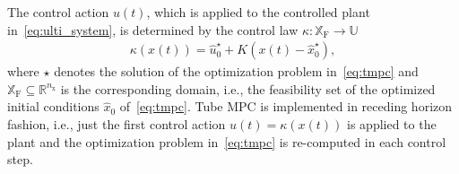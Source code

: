 \documentclass[letterpaper, 10 pt, conference]{ieeeconf}
\begin{document}
The control action $u(t)$, which is applied to the controlled plant in~\eqref{eq:ulti_system}, is determined by the control law $\kappa : \mathbb{X}_{\mathrm{F}} \rightarrow \mathbb{U}$
\begin{eqnarray}
	\label{eq:tmpc_control_law}
	\kappa(x(t)) = \hat{u}_{0}^{\star} + K \left( x(t) - \hat{x}_{0}^{\star} \right),
\end{eqnarray}
where $\star$ denotes the solution of the optimization problem in~\eqref{eq:tmpc} and $\mathbb{X}_{\mathrm{F}} \subseteq \mathbb{R}^{n_{\mathrm{x}}}$ is the corresponding domain, i.e., the feasibility set of the optimized initial conditions $\hat{x}_{0}$ of~\eqref{eq:tmpc}. 
Tube MPC is implemented in receding horizon fashion, i.e., just the first control action $u(t) = \kappa(x(t))$ is applied to the plant and the optimization problem in~\eqref{eq:tmpc} is re-computed in each control step. 

%
%
\end{document}

